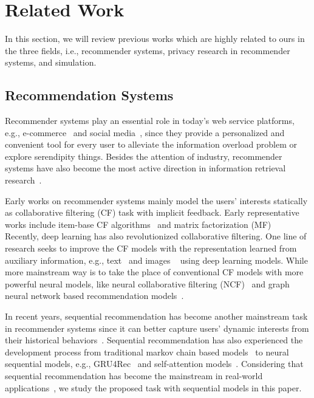 \section{Related Work}
In this section, we will review previous works which are highly related to ours in the three fields, i.e., recommender systems, privacy research in recommender systems, and simulation.



\subsection{Recommendation Systems} 
Recommender systems play an essential role in today's web service platforms, e.g., e-commerce~\cite{Linden:IC03:Amazon,xie21explore} and social media~\cite{Covington:recsys16:Deep,Ying:kdd18:Graph}, since they provide a personalized and convenient tool for every user to alleviate the information overload problem or explore serendipity things.
Besides the attention of industry, recommender systems have also become the most active direction in information retrieval research~\cite{Zhang:csur19:Deep,Quadrana:csur19:Sequence,Wu:Graph}.

Early works on recommender systems mainly model the users' interests statically as collaborative filtering (CF) task with implicit feedback.
Early representative works include item-base CF algorithms~\cite{Sarwar:www01:Item,Linden:IC03:Amazon} and matrix factorization (MF)~\cite{Mnih:nips08:Probabilistic,Koren:Computer09:Matrix}
Recently, deep learning has also revolutionized collaborative filtering.
One line of research seeks to improve the CF models with the representation learned from auxiliary information, e.g., text~\cite{Wang:kdd15:Collaborative} and images ~\cite{Wang:www17:What} using deep learning models.
While more mainstream way is to take the place of conventional CF models with more powerful neural models, like neural collaborative filtering (NCF)~\cite{He:www17:Neural} and graph neural network based recommendation models~\cite{Ying:kdd18:Graph,He:sigir20:LightGCN}.


In recent years, sequential recommendation has become another mainstream task in recommender systems since it can better capture users' dynamic interests from their historical behaviors~\cite{Quadrana:csur19:Sequence}.
Sequential recommendation has also experienced the development process from traditional markov chain based models~\cite{Shani:kmlr05:MDP,Rendle:www10:Factorizing} to neural sequential models, e.g., GRU4Rec~\cite{Hidasi:ICLR2016:gru4rec,hidasi2018recurrent} and self-attention models~\cite{kang2018self,Sun:cikm19:BERT4Rec}.
Considering that sequential recommendation has become the mainstream in real-world applications~\cite{lv2019sdm,Li:cikm19:Multi}, we study the proposed task with sequential models in this paper. 



